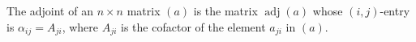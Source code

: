 The adjoint of an $n \times n$ matrix $(a)$ is the matrix $\operatorname{adj}(a)$ whose $(i,j)$-entry is $\alpha_{ij} = A_{ji}$, where $A_{ji}$ is the cofactor of the element $a_{ji}$ in $(a)$.
